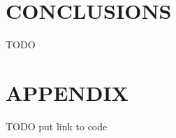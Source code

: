 \documentclass[letterpaper, 10 pt, conference]{ieeeconf}  %
\begin{document}
\section{CONCLUSIONS}
\label{sec:concl}
TODO

\addtolength{\textheight}{-12cm}   %







\section*{APPENDIX}

TODO put link to code
\end{document}
